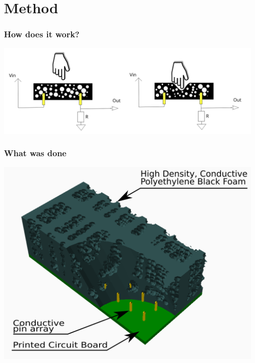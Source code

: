 \documentclass{beamer}
\begin{document}
\section{Method}%
\label{sec:Method}


\begin{frame}
    \frametitle{How does it work?}
    \begin{center}
        \includegraphics[width=\textwidth]{img/foam_howto.png}
    \end{center}
\end{frame}

\begin{frame}
    \frametitle{What was done}
    \begin{center}
        \includegraphics[width=.8\textwidth]{img/sensor_with_arrows_and_text.png}
    \end{center}
\end{frame}
\end{document}
